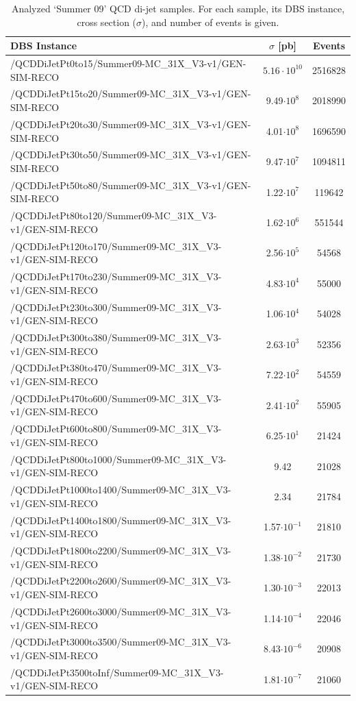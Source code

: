 \documentclass{cmspaper}
\begin{document}
\begin{table}[b]
\belowcaptionskip 0cm
\caption{Analyzed `Summer 09' QCD di-jet samples. For each sample, its DBS instance, cross section ($\sigma$), and number of events is given.}
\label{tab:dbs_dijet}
\begin{center}
\renewcommand{\baselinestretch}{0.8}
\small\normalsize
\begin{tabular}{lcc}
\hline
{\bf DBS Instance}& {\bf $\sigma$ [pb] } & {\bf Events} \\ 
\hline 
/QCDDiJetPt0to15/Summer09-MC\_31X\_V3-v1/GEN-SIM-RECO & $5.16\cdot 10^{10}$ & 2516828 \\
/QCDDiJetPt15to20/Summer09-MC\_31X\_V3-v1/GEN-SIM-RECO & 9.49$\cdot 10^8$ & 2018990 \\
/QCDDiJetPt20to30/Summer09-MC\_31X\_V3-v1/GEN-SIM-RECO & 4.01$\cdot 10^8$ & 1696590\\
/QCDDiJetPt30to50/Summer09-MC\_31X\_V3-v1/GEN-SIM-RECO & 9.47$\cdot 10^7$ & 1094811\\
/QCDDiJetPt50to80/Summer09-MC\_31X\_V3-v1/GEN-SIM-RECO & 1.22$\cdot 10^7$ & 119642\\
/QCDDiJetPt80to120/Summer09-MC\_31X\_V3-v1/GEN-SIM-RECO & 1.62$\cdot 10^6$ & 551544\\
/QCDDiJetPt120to170/Summer09-MC\_31X\_V3-v1/GEN-SIM-RECO & 2.56$\cdot 10^5$ & 54568\\
/QCDDiJetPt170to230/Summer09-MC\_31X\_V3-v1/GEN-SIM-RECO & 4.83$\cdot 10^4$ & 55000\\
/QCDDiJetPt230to300/Summer09-MC\_31X\_V3-v1/GEN-SIM-RECO & 1.06$\cdot 10^4$ & 54028\\
/QCDDiJetPt300to380/Summer09-MC\_31X\_V3-v1/GEN-SIM-RECO & 2.63$\cdot 10^3$ & 52356\\
/QCDDiJetPt380to470/Summer09-MC\_31X\_V3-v1/GEN-SIM-RECO & 7.22$\cdot 10^2$ & 54559\\
/QCDDiJetPt470to600/Summer09-MC\_31X\_V3-v1/GEN-SIM-RECO & 2.41$\cdot 10^2$ & 55905\\
/QCDDiJetPt600to800/Summer09-MC\_31X\_V3-v1/GEN-SIM-RECO & 6.25$\cdot 10^1$ & 21424\\
/QCDDiJetPt800to1000/Summer09-MC\_31X\_V3-v1/GEN-SIM-RECO & 9.42 & 21028\\
/QCDDiJetPt1000to1400/Summer09-MC\_31X\_V3-v1/GEN-SIM-RECO & 2.34 & 21784\\
/QCDDiJetPt1400to1800/Summer09-MC\_31X\_V3-v1/GEN-SIM-RECO & 1.57$\cdot 10^{-1}$ & 21810\\
/QCDDiJetPt1800to2200/Summer09-MC\_31X\_V3-v1/GEN-SIM-RECO & 1.38$\cdot 10^{-2}$ & 21730\\
/QCDDiJetPt2200to2600/Summer09-MC\_31X\_V3-v1/GEN-SIM-RECO & 1.30$\cdot 10^{-3}$ & 22013\\
/QCDDiJetPt2600to3000/Summer09-MC\_31X\_V3-v1/GEN-SIM-RECO & 1.14$\cdot 10^{-4}$ & 22046\\
/QCDDiJetPt3000to3500/Summer09-MC\_31X\_V3-v1/GEN-SIM-RECO & 8.43$\cdot 10^{-6}$ & 20908\\
/QCDDiJetPt3500toInf/Summer09-MC\_31X\_V3-v1/GEN-SIM-RECO & 1.81$\cdot 10^{-7}$ & 21060\\
\hline
\end{tabular}
\end{center}
\end{table}
\end{document}
